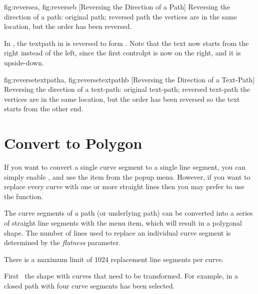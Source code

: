 {
  {fig:reversea}{}{},
  {fig:reverseb}{}{}
}
[Reversing the Direction of a Path]
{Reversing the direction of a path:
 original path;
 reversed path\dash
the vertices are in the same location, but the order has been
reversed.}

In , the \gls*{textpath} in
 is reversed to form 
. Note that the text now starts
from the right instead of the left, since the first \gls*{controlpt}
is now on the right, and it is upside-down.

{
  {fig:reversetextpatha}{}{},
  {fig:reversetextpathb}{}{}
}
[Reversing the Direction of a Text-Path]
{Reversing the direction of a text-path:
 original text-path;
 reversed text-path\dash 
the vertices are in the same location, but the order has been
reversed so the text starts from the other end.}

\section{Convert to Polygon}\label{sec:converttopolygon}

If you want to convert a single \gls{curve} segment to a single
line segment, you can simply enable \editpathmode, and use the 
 item from the popup menu.
However, if you want to replace every curve with one or more straight
lines then you may prefer to use the 
function.


The \gls{curve} segments of a \gls{path} (or underlying path)
can be converted into a series of straight line segments with the
 menu item, which will result in
a polygonal shape. The number of lines used to replace an individual
curve segment is determined by the \emph{flatness} parameter.

\begin{information}
There is a maximum limit of 1024 replacement line segments per
\gls{curve}.
\end{information}

First \select\ the \gls{shape} with \glspl{curve} that need to be transformed.
For example, in  a closed \gls{path}
with four \gls{curve} segments has been selected.

